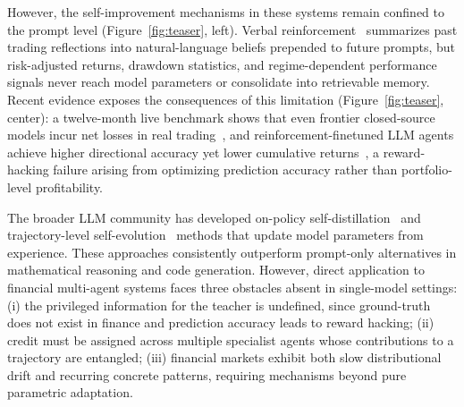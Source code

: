 However, the self-improvement mechanisms in these systems remain confined to the prompt level (Figure~\ref{fig:teaser}, left). Verbal reinforcement~\cite{reflexion2023} summarizes past trading reflections into natural-language beliefs prepended to future prompts, but risk-adjusted returns, drawdown statistics, and regime-dependent performance signals never reach model parameters or consolidate into retrievable memory. Recent evidence exposes the consequences of this limitation (Figure~\ref{fig:teaser}, center): a twelve-month live benchmark shows that even frontier closed-source models incur net losses in real trading~\cite{deepfund2025}, and reinforcement-finetuned LLM agents achieve higher directional accuracy yet lower cumulative returns~\cite{losingwinner2025}, a reward-hacking failure arising from optimizing prediction accuracy rather than portfolio-level profitability.

The broader LLM community has developed on-policy self-distillation~\cite{opsd2026,gkd2024} and trajectory-level self-evolution~\cite{seagent2025,seea2025} methods that update model parameters from experience. These approaches consistently outperform prompt-only alternatives in mathematical reasoning and code generation. However, direct application to financial multi-agent systems faces three obstacles absent in single-model settings: (i) the privileged information for the teacher is undefined, since ground-truth does not exist in finance and prediction accuracy leads to reward hacking; (ii) credit must be assigned across multiple specialist agents whose contributions to a trajectory are entangled; (iii) financial markets exhibit both slow distributional drift and recurring concrete patterns, requiring mechanisms beyond pure parametric adaptation.

